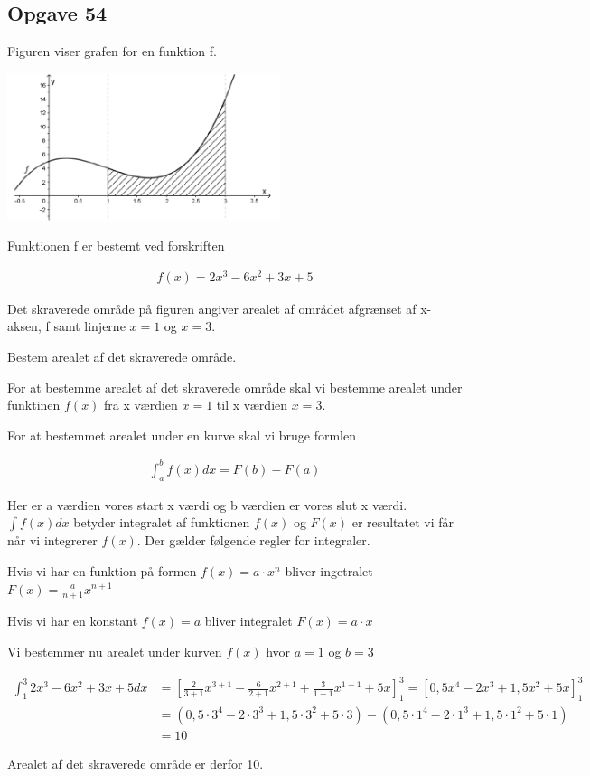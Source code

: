 \subsection{Opgave 54}

Figuren viser grafen for en funktion f. 

\includegraphics[width=8cm]{Opgave_51-56/Opgave_54/54.png}

Funktionen f er bestemt ved forskriften 

\begin{align*}
    f(x) = 2x^3 - 6x^2 +3x +5
\end{align*}

Det skraverede område på figuren angiver arealet af området afgrænset af x-aksen, f samt linjerne $x = 1$ og $x = 3$.

Bestem arealet af det skraverede område.

\ans

For at bestemme arealet af det skraverede område skal vi bestemme arealet under funktinen $f(x)$
fra x værdien $x = 1$ til x værdien $x = 3$.

For at bestemmet arealet under en kurve skal vi bruge formlen 

\begin{align*}
    \int_a^b f(x) dx = F(b) - F(a)
\end{align*}

Her er a værdien vores start x værdi og b værdien er vores slut x værdi.
$\int f(x) dx$ betyder integralet af funktionen $f(x)$ og $F(x)$ er resultatet vi får når vi integrerer $f(x)$. Der gælder følgende regler for integraler.

Hvis vi har en funktion på formen $f(x) = a\cdot x^n$ bliver ingetralet
$F(x) = \frac{a}{n + 1}x^{n + 1}$

Hvis vi har en konstant $f(x) = a$ bliver integralet 
$F(x) = a\cdot x$

Vi bestemmer nu arealet under kurven $f(x)$ hvor $a = 1$ og $b = 3$

\begin{align*}
    \int_1^3 2x^3 - 6x^2 +3x +5 dx &= \left[\frac{2}{3 + 1}x^{3+1} - \frac{6}{2 + 1}x^{2+1} + \frac{3}{1 + 1}x^{1+1} + 5x \right]_1^3 = \left[0,5x^4 - 2x^3 + 1,5x^2 + 5x\right]_1^3\\
    &= (0,5\cdot 3^4 - 2\cdot 3^3 + 1,5 \cdot 3^2 + 5\cdot 3) - (0,5 \cdot 1^4 - 2\cdot 1^3 + 1,5 \cdot 1^2 + 5 \cdot 1)\\
    &= 10
\end{align*}

Arealet af det skraverede område er derfor 10.